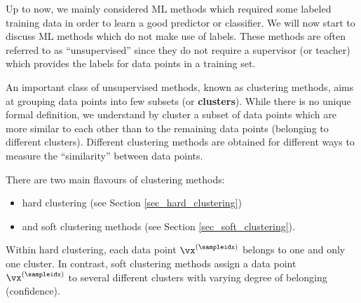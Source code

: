 \documentclass[12pt]{report}
\begin{document}
Up to now, we mainly considered ML methods which required 
some labeled training data in order to learn a good predictor or 
classifier. We will now start to discuss ML methods which do 
not make use of labels. These methods are often referred to as 
``unsupervised'' since they do not require a supervisor 
(or teacher) which provides the labels for data points in a training set. 

An important class of unsupervised methods, known as clustering 
methods, aims at grouping data points into few subsets (or {\bf clusters}). 
While there is no unique formal definition, we understand by cluster 
a subset of data points which are more similar to each other than 
to the remaining data points (belonging to different clusters). Different 
clustering methods are obtained for different ways to measure the 
``similarity'' between data points. 

%
%

There are two main flavours of clustering methods: 
\begin{itemize} 
\item hard clustering (see Section \ref{sec_hard_clustering}) 
\item and soft clustering methods (see Section \ref{sec_soft_clustering}).
\end{itemize}
Within hard clustering, each data point $\vx^{(\sampleidx)}$ belongs to one and only one cluster. In contrast, 
soft clustering methods assign a data point $\vx^{(\sampleidx)}$ to several different clusters with varying degree 
of belonging (confidence). 
\end{document}
